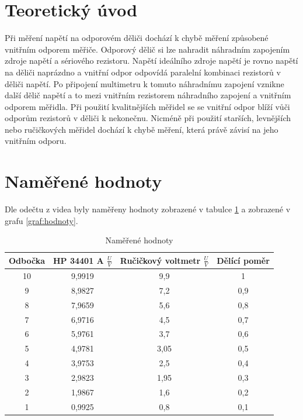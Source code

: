 \documentclass[a4paper,12pt]{article}   %
\begin{document}
\section{Teoretický úvod}
Při měření napětí na odporovém děliči dochází k chybě měření způsobené vnitřním odporem měřiče. Odporový dělič si lze nahradit náhradním zapojením zdroje napětí a sériového rezistoru. Napětí ideálního zdroje napětí je rovno napětí na děliči naprázdno a vnitřní odpor odpovídá paralelní kombinaci rezistorů v děliči napětí. Po připojení multimetru k tomuto náhradnímu zapojení vznikne další dělič napětí a to mezi vnitřním rezistorem náhradního zapojení a vnitřním odporem měřidla. Při použití kvalitnějších měřidel se se vnitřní odpor blíží vůči odporům rezistorů v děliči k nekonečnu. Nicméně při použití starších, levnějších nebo ručičkových měřidel dochází k chybě měření, která právě závisí na jeho vnitřním odporu. 


\section{Naměřené hodnoty}
Dle odečtu z videa byly naměřeny hodnoty zobrazené v tabulce \ref{tab:hodnoty} a zobrazené v grafu \ref{graf:hodnoty}.

\begin{table}[h!]
    \centering
    \begin{tabular}{|c|c|c|c|}
    \hline
        \rule{0pt}{2.5ex} Odbočka & HP 34401 A $\frac{U}{V}$ & Ručičkový voltmetr $\frac{U}{V}$&Dělící poměr\\[.7ex] \hline\hline
        10 &	9,9919 &	9,9 &   1   \\\hline
        9 &	8,9827 &	7,2 &   0,9 \\\hline
        8 &	7,9659 &	5,6 &   0,8 \\\hline
        7 &	6,9716 &	4,5 &   0,7 \\\hline
        6 &	5,9761 &	3,7 &   0,6 \\\hline
        5 &	4,9781 &	3,05&   0,5 \\\hline
        4 &	3,9753 &	2,5 &   0,4 \\\hline
        3 &	2,9823 &	1,95&   0,3 \\\hline
        2 &	1,9867 &	1,6 &   0,2 \\\hline
        1 &	0,9925 &	0,8 &   0,1 \\\hline
    \end{tabular}
    \caption{Naměřené hodnoty}
    \label{tab:hodnoty}
\end{table}
\end{document}
